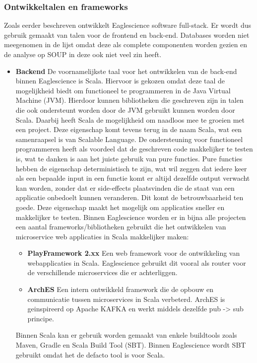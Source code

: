 \subsubsection{Ontwikkeltalen en frameworks}\label{subsubsec:ontwikkeltalen-en-frameworks}
Zoals eerder beschreven ontwikkelt Eaglescience software full-stack. Er wordt dus gebruik gemaakt van talen voor de frontend en back-end. Databases worden niet meegenomen in de lijst omdat deze als complete componenten worden gezien en de analyse op SOUP in deze ook niet veel zin heeft.
\begin{itemize}
    \item \textbf{Backend} De voornamelijkste taal voor het ontwikkelen van de back-end binnen Eaglescience is Scala. Hiervoor is gekozen omdat deze taal de mogelijkheid biedt om functioneel te programmeren in de Java Virtual Machine (JVM). Hierdoor kunnen bibliotheken die geschreven zijn in talen die ook ondersteunt worden door de JVM gebruikt kunnen worden door Scala. Daarbij heeft Scala de mogelijkheid om naadloos mee te groeien met een project. Deze eigenschap komt tevens terug in de naam Scala, wat een samenraapsel is van Scalable Language. De ondersteuning voor functioneel programmeren heeft als voordeel dat de geschreven code makkelijker te testen is, wat te danken is aan het juiste gebruik van pure functies. Pure functies hebben de eigenschap deterministisch te zijn, wat wil zeggen dat iedere keer als een bepaalde input in een functie komt er altijd dezelfde output verwacht kan worden, zonder dat er side-effects plaatsvinden die de staat van een applicatie onbedoelt kunnen veranderen. Dit komt de betrouwbaarheid ten goede. Deze eigenschap maakt het mogelijk om applicaties sneller en makkelijker te testen. Binnen Eaglescience worden er in bijna alle projecten een aantal frameworks/bibliotheken gebruikt die het ontwikkelen van microservice web applicaties in Scala makkelijker maken:
    \begin{itemize}
        \item \textbf{PlayFramework 2.xx} Een web framework voor de ontwikkeling van webapplicaties in Scala. Eaglescience gebruikt dit vooral als router voor de verschillende microservices die er achterliggen.
        \item \textbf{ArchES} Een intern ontwikkeld framework die de opbouw en communicatie tussen microservices in Scala verbeterd. ArchES is geinspireerd op Apache KAFKA en werkt middels dezelfde pub -> sub principe.
    \end{itemize} Binnen Scala kan er gebruik worden gemaakt van enkele buildtools zoals Maven, Gradle en Scala Build Tool (SBT). Binnen Eaglescience wordt SBT gebruikt omdat het de defacto tool is voor Scala.

\end{itemize}
